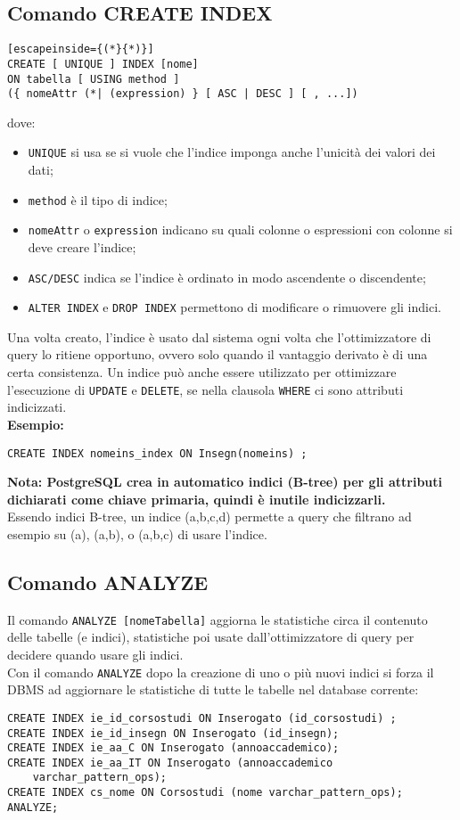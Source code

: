 \documentclass[a4paper, 10pt, titlepage]{article}
\begin{document}
	\subsection{Comando CREATE INDEX} \label{createindex}
	\begin{lstlisting}[escapeinside={(*}{*)}]
CREATE [ UNIQUE ] INDEX [nome]
ON tabella [ USING method ]
({ nomeAttr (*| (expression) } [ ASC | DESC ] [ , ...])
	\end{lstlisting}
	dove:
	\begin{itemize}
		\item \lstinline|UNIQUE| si usa se si vuole che l'indice imponga anche l'unicità dei valori dei dati;
		\item \verb|method| è il tipo di indice;
		\item \verb|nomeAttr| o \verb|expression| indicano su quali colonne o espressioni con colonne si deve creare l'indice;
		\item \lstinline|ASC/DESC| indica se l’indice è ordinato in modo ascendente o discendente;
		\item \lstinline|ALTER INDEX| e \lstinline|DROP INDEX| permettono di modificare o rimuovere gli indici.
	\end{itemize}

	Una volta creato, l'indice è usato dal sistema ogni volta che l'ottimizzatore di query lo ritiene opportuno, ovvero solo quando il vantaggio derivato è di una certa consistenza. Un indice può anche essere utilizzato per ottimizzare l'esecuzione di \lstinline|UPDATE| e \lstinline|DELETE|, se nella clausola \lstinline|WHERE| ci sono attributi indicizzati. \medskip \\
	\textbf{Esempio:}
	\begin{lstlisting}
CREATE INDEX nomeins_index ON Insegn(nomeins) ;
	\end{lstlisting} \medskip
	\textbf{Nota: PostgreSQL crea in automatico indici (B-tree) per gli attributi dichiarati come chiave primaria, quindi è inutile indicizzarli.}\\
	Essendo indici B-tree, un indice (a,b,c,d) permette a query che filtrano ad esempio su (a), (a,b), o (a,b,c) di usare l'indice.
	
	\subsection{Comando ANALYZE}
	Il comando \lstinline|ANALYZE [nomeTabella]| aggiorna le statistiche circa il contenuto delle tabelle (e indici), statistiche poi usate dall'ottimizzatore di query per decidere quando usare gli indici.\\
	Con il comando \lstinline|ANALYZE| dopo la creazione di uno o più nuovi indici si forza il DBMS ad aggiornare le statistiche di tutte le tabelle nel database corrente:
	\begin{lstlisting}
CREATE INDEX ie_id_corsostudi ON Inserogato (id_corsostudi) ;
CREATE INDEX ie_id_insegn ON Inserogato (id_insegn);
CREATE INDEX ie_aa_C ON Inserogato (annoaccademico);
CREATE INDEX ie_aa_IT ON Inserogato (annoaccademico
	varchar_pattern_ops);
CREATE INDEX cs_nome ON Corsostudi (nome varchar_pattern_ops);
ANALYZE;
	\end{lstlisting}
	
\end{document}

